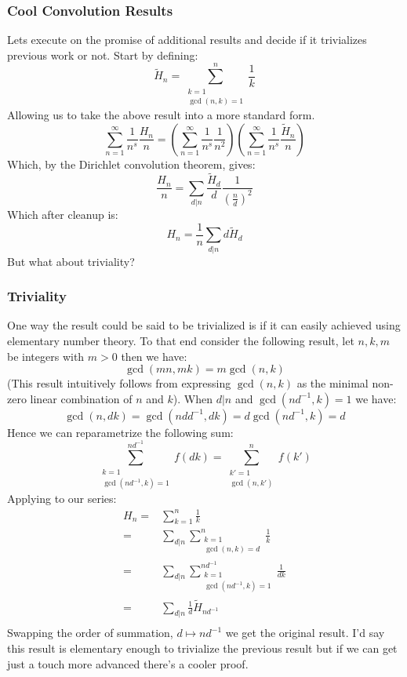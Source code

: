 \subsubsection{Cool Convolution Results}
Lets execute on the promise of additional results and decide if it trivializes previous work or not.
Start by defining:
\[\tilde{H}_n = \sum_{\substack{k=1\\\gcd(n,k)=1}}^n\frac{1}{k}\]
Allowing us to take the above result into a more standard form.
\[ \sum_{n=1}^\infty\frac{1}{n^s}\frac{H_n}{n}=\left(\sum_{n=1}^\infty\frac{1}{n^s}\frac{1}{n^2}\right)\left(\sum_{n=1}^\infty\frac{1}{n^s}\frac{\tilde{H}_n}{n}\right)\]
Which, by the Dirichlet convolution theorem, gives:
\[\frac{H_n}{n} = \sum_{d|n}\frac{\tilde{H}_d}{d}\frac{1}{\left(\frac{n}{d}\right)^2}\]
Which after cleanup is:
\[H_n = \frac{1}{n}\sum_{d|n}d\tilde{H}_d\]
But what about triviality?
\\

\subsubsection{Triviality}
One way the result could be said to be trivialized is if it can easily achieved using elementary number theory.
To that end consider the following result,
let $n,k,m$ be integers with $m>0$ then we have:
\[\gcd(mn,mk)=m\gcd(n,k)\]
(This result intuitively follows from expressing $\gcd(n,k)$ as the minimal non-zero linear combination of $n$ and $k$).
When $d|n$ and $\gcd(nd^{-1},k)=1$ we have:
\[\gcd(n,dk) = \gcd(ndd^{-1},dk) = d\gcd(nd^{-1},k) = d\]
Hence we can reparametrize the following sum:
\[\sum_{\substack{k=1\\\gcd(nd^{-1},k)=1}}^{nd^{-1}}f(dk)=\sum_{\substack{k'=1\\\gcd(n,k')}}^nf(k')\]
Applying to our series:
\begin{equation*}
\begin{aligned}
	H_n =& \sum_{k=1}^n\frac{1}{k}\\
	=& \sum_{d|n}\sum_{\substack{k=1\\\gcd(n,k)=d}}^n\frac{1}{k}\\
	=& \sum_{d|n}\sum_{\substack{k=1\\\gcd(nd^{-1},k)=1}}^{nd^{-1}}\frac{1}{dk}\\
	=& \sum_{d|n}\frac{1}{d}\tilde{H}_{nd^{-1}}\\
\end{aligned}
\end{equation*}
Swapping the order of summation, $d\mapsto nd^{-1}$ we get the original result.
I'd say this result is elementary enough to trivialize the previous result but if we can get just a touch more advanced there's a cooler proof.
\\

